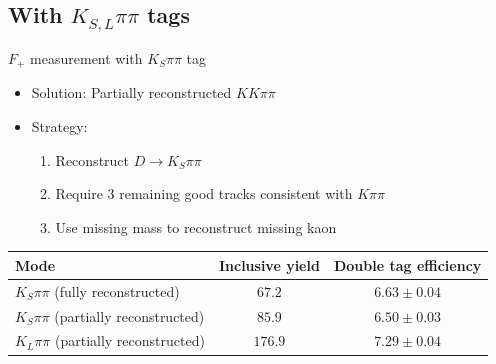 \documentclass{beamer}
\begin{document}
\subsection{With \texorpdfstring{$K_{S, L}\pi\pi$}{K0pipi} tags}
\begin{frame}{$F_+$ measurement with $K_S\pi\pi$ tag}
  \begin{itemize}
    \setlength\itemsep{1.0em}
    \item{Solution: Partially reconstructed $KK\pi\pi$}
    \item{Strategy:}
    \begin{enumerate}
      \setlength\itemsep{0.5em}
      \item{Reconstruct $D\to K_S\pi\pi$}
      \item{Require 3 remaining good tracks consistent with $K\pi\pi$}
      \item{Use missing mass to reconstruct missing kaon}
    \end{enumerate}
  \end{itemize}
  \vspace{0.5cm}
  \def\arraystretch{1.2}%
  \begin{tabular}{l|c|c}
    Mode                                     & Inclusive yield & Double tag efficiency \\
    \hline
    $K_S\pi\pi$ (fully reconstructed)        & $67.2$          & $6.63 \pm 0.04$ \\
    $K_S\pi\pi$ (partially reconstructed)    & $85.9$          & $6.50 \pm 0.03$ \\
    $K_L\pi\pi$ (partially reconstructed)    & $176.9$         & $7.29 \pm 0.04$ \\
    \hline
  \end{tabular}
\end{frame}
\end{document}
